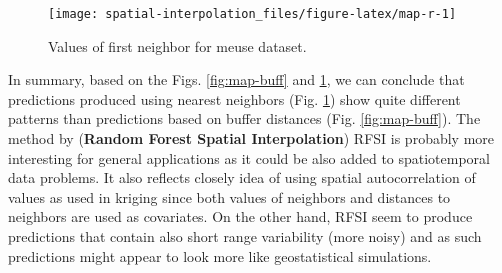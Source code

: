 \documentclass[
  graybox,natbib,nospthms]{svmono}
\newenvironment{Shaded}{\begin{snugshade}}{\end{snugshade}}
\newcommand{\AttributeTok}[1]{\textcolor[rgb]{0.61,0.61,0.61}{#1}}
\newcommand{\CommentTok}[1]{\textcolor[rgb]{0.37,0.37,0.37}{\textit{#1}}}
\newcommand{\ConstantTok}[1]{\textcolor[rgb]{0,0,0}{#1}}
\newcommand{\DecValTok}[1]{\textcolor[rgb]{0.06,0.06,0.06}{#1}}
\newcommand{\FunctionTok}[1]{\textcolor[rgb]{0,0,0}{#1}}
\newcommand{\NormalTok}[1]{#1}
\newcommand{\OtherTok}[1]{\textcolor[rgb]{0.37,0.37,0.37}{#1}}
\newcommand{\SpecialCharTok}[1]{\textcolor[rgb]{0,0,0}{#1}}
\newcommand{\StringTok}[1]{\textcolor[rgb]{0.5,0.5,0.5}{#1}}
\begin{document}
\begin{Shaded}
\end{Shaded}

\begin{figure}

{\centering \texttt{[image: spatial-interpolation\_files/figure-latex/map-r-1]} 

}

\caption{Values of first neighbor for meuse dataset.}\label{fig:map-r}
\end{figure}

In summary, based on the Figs. \ref{fig:map-buff} and \ref{fig:map-r},
we can conclude that predictions produced using nearest neighbors (Fig. \ref{fig:map-r}) show quite different patterns than
predictions based on buffer distances (Fig. \ref{fig:map-buff}). The method by \citet{sekulic2020random}
(\textbf{Random Forest Spatial Interpolation}) RFSI is probably more interesting for general applications as it could be
also added to spatiotemporal data problems. It also reflects closely idea of using
spatial autocorrelation of values as used in kriging since both values of neighbors and
distances to neighbors are used as covariates. On the other hand, RFSI seem to
produce predictions that contain also short range variability (more noisy) and as
such predictions might appear to look more like geostatistical simulations.
\end{document}
